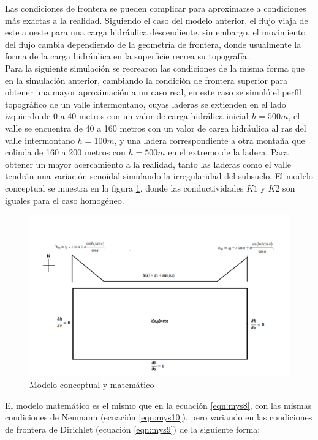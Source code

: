 Las condiciones de frontera se pueden complicar para aproximarse a condiciones más exactas a la realidad. Siguiendo el caso del modelo anterior, el flujo viaja de este a oeste para una carga hidráulica descendiente, sin embargo, el movimiento del flujo cambia dependiendo de la geometría de frontera, donde usualmente la forma de la carga hidráulica en la superficie recrea su topografía.
\\

Para la siguiente simulación se recrearon las condiciones de la misma forma que en la simulación anterior, cambiando la condición de frontera superior para obtener una mayor aproximación a un caso real, en este caso se simuló el perfil topográfico de un valle intermontano, cuyas laderas se extienden en el lado izquierdo de 0 a 40 metros con un valor de carga hidrálica inicial $h=500 m$, el valle se encuentra de 40 a 160 metros con un valor de carga hidráulica al ras del valle intermontano $h=100 m$, y una ladera correspondiente a otra montaña que colinda de 160 a 200 metros con $h=500 m$ en el extremo de la ladera. Para obtener un mayor acercamiento a la realidad, tanto las laderas como el valle tendrán una variación senoidal simulando la irregularidad del subsuelo. El modelo conceptual se muestra en la figura \ref{Figura3:3a}, donde las conductividades $K1$ y $K2$ son iguales para el caso homogéneo. 

 \begin{figure}[H]
\centering
\includegraphics[scale=0.30]{Figura_29c.png}
\caption{ Modelo conceptual y matemático}
\label{Figura3:3a}
\end{figure}

El modelo matemático es el mismo que en la ecuación \ref{eqn:mys8}, con las mismas condiciones de Neumann (ecuación \ref{eqn:mys10}), pero variando en las condiciones de frontera de Dirichlet (ecuación \ref{eqn:mys9}) de la siguiente forma:

